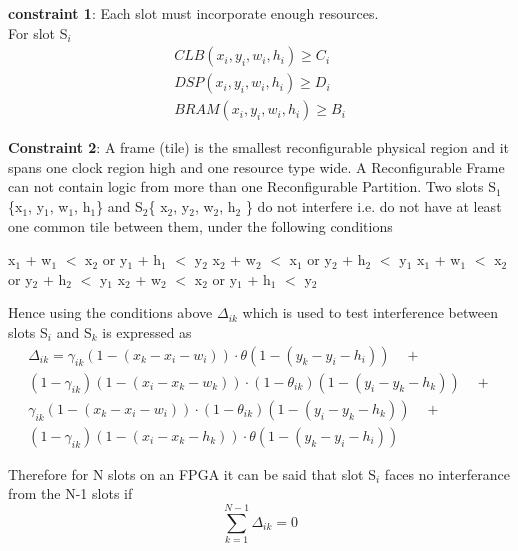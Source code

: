 \documentclass[conference]{IEEEtran}
\begin{document}
\textbf{constraint 1}: Each slot must incorporate enough resources. \\
For slot S$_i$
\begin{equation}
\begin{split}
CLB(x_{i}, y_{i}, w_{i}, h_{i}) \geq  C_{i}\\
DSP(x_{i}, y_{i}, w_{i}, h_{i}) \geq  D_{i} \\	
BRAM(x_{i}, y_{i}, w_{i}, h_{i}) \geq  B_{i}
\end{split}
\end{equation}

\textbf{Constraint 2}: A frame (tile) is the smallest reconfigurable physical region and it spans one clock region high and one resource type wide. A Reconfigurable Frame can not contain logic from more than one Reconfigurable Partition. Two slots S$_1$ \{x$_1$, y$_1$, w$_1$, h$_1$\} and S$_2$\{ x$_2$, y$_2$, w$_2$, h$_2$ \} do not interfere i.e. do not have at least one common tile between them, under the following conditions \\

\begin{algorithmic}
	\STATE x$_1$ + w$_1$ $<$ x$_2$ or y$_1$ + h$_1$ $<$ y$_2$
	\STATE x$_2$ + w$_2$ $<$ x$_1$ or y$_2$ + h$_2$ $<$ y$_1$
	\STATE x$_1$ + w$_1$ $<$ x$_2$ or y$_2$ + h$_2$ $<$ y$_1$
\ELSE
	\STATE x$_2$ + w$_2$ $<$ x$_2$ or y$_1$ + h$_1$ $<$ y$_2$
\ENDIF
\end{algorithmic}

Hence using the conditions above $\Delta_{ik}$ which is used to test interference between slots S$_i$ and S$_k$ is expressed as
\begin{equation}
\begin{split}
\Delta_{ik} = \gamma_{ik}(1-(x_k-x_i-w_i)) \cdot \theta(1-(y_k-y_i-h_i))  \quad + \\
			   	(1-\gamma_{ik})(1-(x_i-x_k-w_k)) \cdot (1-\theta_{ik})(1-(y_i-y_k-h_k))\quad  + \\
			   \gamma_{ik}(1-(x_k-x	_i-w_i)) \cdot (1-\theta_{ik})(1-(y_i-y_k-h_k))\quad + \\
			   (1-\gamma_{ik})(1-(x_i-x_k-h_k)) \cdot \theta(1-(y_k-y_i-h_i)) 
\end{split}
\end{equation}

Therefore for N slots on an FPGA it can be said that slot S$_i$ faces no interferance from the N-1 slots if
\begin{equation}
\sum_{k=1}^{N-1} \Delta_{ik} = 0
\end{equation}  
 
\end{document}
